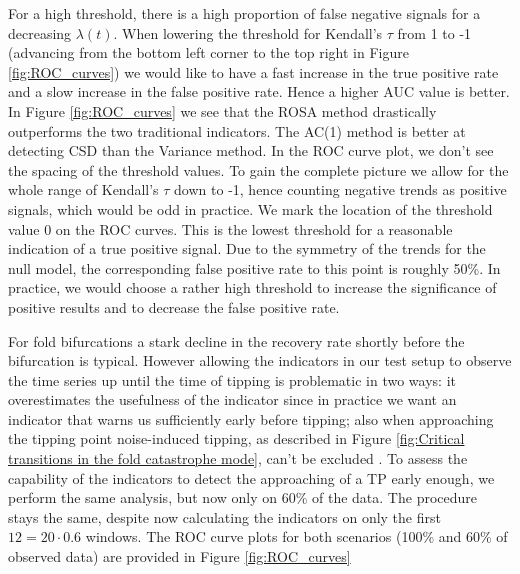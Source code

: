 \documentclass[%
thesis=student,%
coverpage=false,%
titlepage=false,%
headmarks=true, %
english,%
font=libertine, %
math=newpxtx, %
BCOR=5mm,%
coverBCOR=11mm%
]{tumbook}
\begin{document}
For a high threshold, there is a high proportion of false negative signals for a decreasing $\lambda(t)$. When lowering the threshold for Kendall's $\tau$ from 1 to -1 (advancing from the bottom left corner to the top right in Figure \ref{fig:ROC_curves}) we would like to have a fast increase in the true positive rate and a slow increase in the false positive rate. Hence a higher AUC value is better. In Figure \ref{fig:ROC_curves} we see that the ROSA method drastically outperforms the two traditional indicators. The AC(1) method is better at detecting CSD than the Variance method.  
In the ROC curve plot, we don't see the spacing of the threshold values. To gain the complete picture we allow for the whole range of Kendall's $\tau$ down to -1, hence counting negative trends as positive signals, which would be odd in practice. We mark the location of the threshold value 0 on the ROC curves. This is the lowest threshold for a reasonable indication of a true positive signal. Due to the symmetry of the trends for the null model, the corresponding false positive rate to this point is roughly 50\%. In practice, we would choose a rather high threshold to increase the significance of positive results and to decrease the false positive rate.

For fold bifurcations a stark decline in the recovery rate shortly before the bifurcation is typical. However allowing the indicators in our test setup to observe the time series up until the time of tipping is problematic in two ways: it overestimates the usefulness of the indicator since in practice we want an indicator that warns us sufficiently early before tipping; also when approaching the tipping point noise-induced tipping, as described in Figure \ref{fig:Critical transitions in the fold catastrophe mode}, can't be excluded \cite{Ashwin:2012,Meng:2020}. To assess the capability of the indicators to detect the approaching of a TP early enough, we perform the same analysis, but now only on 60\% of the data. The procedure stays the same, despite now calculating the indicators on only the first $12 = 20 \cdot 0.6$ windows. The ROC curve plots for both scenarios (100\% and 60\% of observed data) are provided in Figure \ref{fig:ROC_curves}
\end{document}
